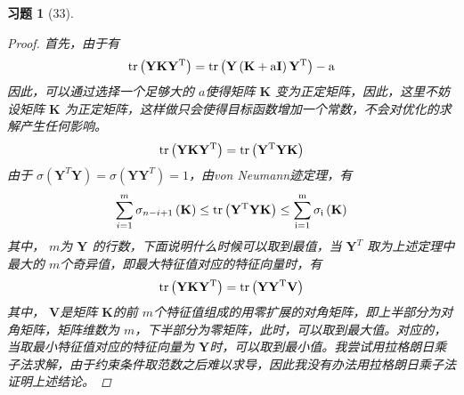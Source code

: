 \documentclass[a4paper, UTF8]{ctexart}
\newtheorem*{exercise}{\textbf{习题}}
\begin{document}
\begin{exercise}[33]
  \begin{proof}
    首先，由于有
    \begin{equation*}
      \rm{tr}\left( \mathbf{Y}\mathbf{K}\mathbf{Y}^T \right)=\rm{tr}\left( \mathbf{Y}\left( \mathbf{K} + a\mathbf{I}  \right)\mathbf{Y}^T \right)-a
    \end{equation*}
    因此，可以通过选择一个足够大的 $a$使得矩阵 $\mathbf{K}$ 变为正定矩阵，因此，这里不妨设矩阵 $\mathbf{K}$ 为正定矩阵，这样做只会使得目标函数增加一个常数，不会对优化的求解产生任何影响。
    \begin{equation*}
      \rm{tr}\left( \mathbf{Y} \mathbf{K} \mathbf{Y}^T \right)=\rm{tr}\left( \mathbf{Y}^T \mathbf{Y} \mathbf{K} \right)
    \end{equation*}
    由于 $\sigma \left( \mathbf{Y}^T \mathbf{Y} \right)=\sigma \left( \mathbf{Y} \mathbf{Y}^T \right) = 1$，由von Neumann迹定理，有
    \begin{equation*}
      \sum_{i=1}^m \sigma_{n-i+1}\left( \mathbf{K} \right)\le \rm{tr}\left( \mathbf{Y}^T \mathbf{Y} \mathbf{K} \right) \le \sum_{i=1}^m \sigma_{i} \left( \mathbf{K} \right)
    \end{equation*}
    其中， $m$为 $\mathbf{Y}$ 的行数，下面说明什么时候可以取到最值，当 $\mathbf{Y}^T$ 取为上述定理中最大的 $m$个奇异值，即最大特征值对应的特征向量时，有
    \begin{equation*}
      \rm{tr}\left( \mathbf{Y}\mathbf{K}\mathbf{Y}^T \right) = \rm{tr}\left( \mathbf{Y}\mathbf{Y}^T \mathbf{V} \right)
    \end{equation*}
    其中， $\mathbf{V}$是矩阵 $\mathbf{K}$的前 $m$个特征值组成的用零扩展的对角矩阵，即上半部分为对角矩阵，矩阵维数为 $m$，下半部分为零矩阵，此时，可以取到最大值。对应的，当取最小特征值对应的特征向量为 $\mathbf{Y}$时，可以取到最小值。我尝试用拉格朗日乘子法求解，由于约束条件取范数之后难以求导，因此我没有办法用拉格朗日乘子法证明上述结论。
  \end{proof}
\end{exercise}
\end{document}

